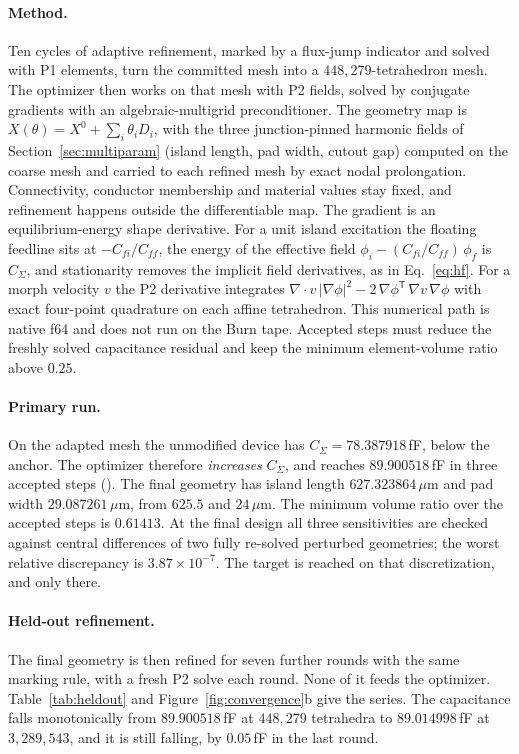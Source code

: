\documentclass{anvil-paper}
\begin{document}
\paragraph{Method.}
Ten cycles of adaptive refinement, marked by a flux-jump indicator and
solved with P1 elements, turn the committed mesh into a
$448{,}279$-tetrahedron mesh. The optimizer then works on that mesh
with P2 fields, solved by conjugate gradients with an
algebraic-multigrid preconditioner. The geometry map is
$X(\theta) = X^0 + \sum_i \theta_i D_i$, with the three junction-pinned
harmonic fields of Section~\ref{sec:multiparam} (island length, pad
width, cutout gap) computed on the coarse mesh and carried to each
refined mesh by exact nodal prolongation. Connectivity, conductor
membership and material values stay fixed, and refinement happens
outside the differentiable map. The gradient is an equilibrium-energy
shape derivative. For a unit island excitation the floating feedline
sits at $-C_{fi}/C_{ff}$, the energy of the effective field
$\phi_i - (C_{fi}/C_{ff})\,\phi_f$ is $C_\Sigma$, and stationarity
removes the implicit field derivatives, as in Eq.~\eqref{eq:hf}. For a
morph velocity $v$ the P2 derivative integrates
$\nabla\!\cdot v\,\lvert\nabla\phi\rvert^2
 - 2\,\nabla\phi^{\mathsf T}\,\nabla v\,\nabla\phi$
with exact four-point quadrature on each affine tetrahedron. This numerical path is native f64 and does not run
on the Burn tape. Accepted steps must reduce the freshly solved
capacitance residual and keep the minimum element-volume ratio above
$0.25$.

\paragraph{Primary run.}
On the adapted mesh the unmodified device has $C_\Sigma =
78.387918$\,fF, below the anchor. The optimizer therefore
\emph{increases} $C_\Sigma$, and reaches $89.900518$\,fF in three
accepted steps
().
The final geometry has island length $627.323864\,\mu$m and pad width
$29.087261\,\mu$m, from $625.5$ and $24\,\mu$m. The minimum
volume ratio over the accepted steps is $0.61413$. At the final design
all three sensitivities are checked against central differences of two
fully re-solved perturbed geometries; the worst relative discrepancy is
$3.87\times10^{-7}$. The target is reached on that discretization, and
only there.

\paragraph{Held-out refinement.}
The final geometry is then refined for seven further rounds with the
same marking rule, with a fresh P2 solve each round. None of it feeds
the optimizer. Table~\ref{tab:heldout} and
Figure~\ref{fig:convergence}b give the series. The capacitance falls
monotonically from $89.900518$\,fF at $448{,}279$ tetrahedra to
$89.014998$\,fF at $3{,}289{,}543$, and it is still falling, by
$0.05$\,fF in the last round.
\end{document}
